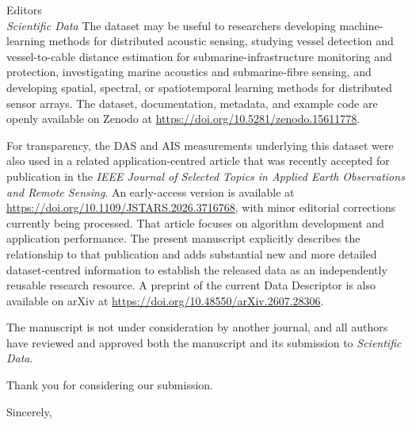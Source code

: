 \documentclass[11pt]{letter}
\begin{document}
\begin{letter}{Editors\\\textit{Scientific Data}}
The dataset may be useful to researchers developing machine-learning methods
for distributed acoustic sensing, studying vessel detection and
vessel-to-cable distance estimation for submarine-infrastructure monitoring and
protection, investigating marine acoustics and submarine-fibre sensing, and
developing spatial, spectral, or spatiotemporal learning methods for distributed
sensor arrays. The dataset, documentation, metadata, and example code are openly
available on Zenodo at
\href{https://doi.org/10.5281/zenodo.15611778}{https://doi.org/10.5281/zenodo.15611778}.

For transparency, the DAS and AIS measurements underlying this dataset were
also used in a related application-centred article that was recently accepted
for publication in the \textit{IEEE Journal of Selected Topics in Applied Earth
Observations and Remote Sensing}. An early-access version is available at
\href{https://doi.org/10.1109/JSTARS.2026.3716768}{https://doi.org/10.1109/JSTARS.2026.3716768},
with minor editorial corrections currently being processed. That article
focuses on algorithm development and application performance. The present
manuscript explicitly describes the relationship to that publication and adds
substantial new and more detailed dataset-centred information to establish the
released data as an independently reusable research resource. A preprint of the
current Data Descriptor is also available on arXiv at
\href{https://doi.org/10.48550/arXiv.2607.28306}{https://doi.org/10.48550/arXiv.2607.28306}.

The manuscript is not under consideration by another journal, and all authors
have reviewed and approved both the manuscript and its submission to
\textit{Scientific Data}.

Thank you for considering our submission.

\closing{Sincerely,}

\end{letter}
\end{document}
